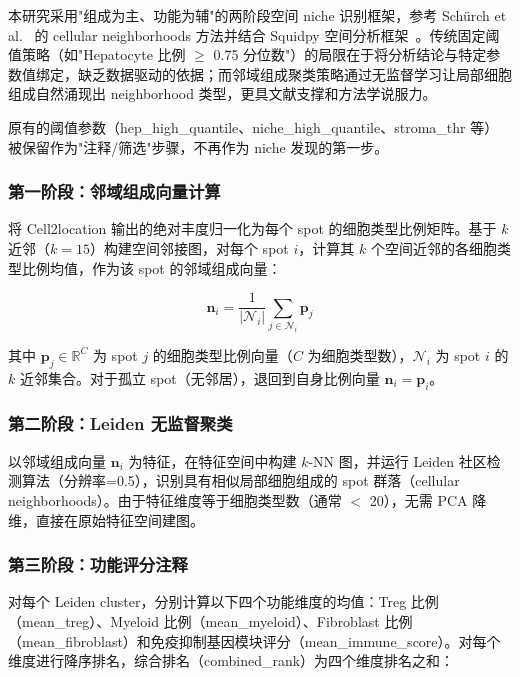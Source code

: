 \documentclass[12pt, a4paper]{ctexart}
\begin{document}
本研究采用"组成为主、功能为辅"的两阶段空间 niche 识别框架，参考 Schürch et al.~\cite{schurch2020coordinated} 的 cellular neighborhoods 方法并结合 Squidpy 空间分析框架~\cite{palla2022squidpy}。传统固定阈值策略（如"Hepatocyte 比例 $\geq$ 0.75 分位数"）的局限在于将分析结论与特定参数值绑定，缺乏数据驱动的依据；而邻域组成聚类策略通过无监督学习让局部细胞组成自然涌现出 neighborhood 类型，更具文献支撑和方法学说服力。

原有的阈值参数（hep\_high\_quantile、niche\_high\_quantile、stroma\_thr 等）被保留作为"注释/筛选"步骤，不再作为 niche 发现的第一步。

\subsubsection{第一阶段：邻域组成向量计算}

将 Cell2location 输出的绝对丰度归一化为每个 spot 的细胞类型比例矩阵。基于 $k$ 近邻（$k=15$）构建空间邻接图，对每个 spot $i$，计算其 $k$ 个空间近邻的各细胞类型比例均值，作为该 spot 的邻域组成向量：

\begin{equation}
\mathbf{n}_i = \frac{1}{|\mathcal{N}_i|} \sum_{j \in \mathcal{N}_i} \mathbf{p}_j
\end{equation}

其中 $\mathbf{p}_j \in \mathbb{R}^{C}$ 为 spot $j$ 的细胞类型比例向量（$C$ 为细胞类型数），$\mathcal{N}_i$ 为 spot $i$ 的 $k$ 近邻集合。对于孤立 spot（无邻居），退回到自身比例向量 $\mathbf{n}_i = \mathbf{p}_i$。

\subsubsection{第二阶段：Leiden 无监督聚类}

以邻域组成向量 $\mathbf{n}_i$ 为特征，在特征空间中构建 $k$-NN 图，并运行 Leiden 社区检测算法（分辨率=0.5），识别具有相似局部细胞组成的 spot 群落（cellular neighborhoods）。由于特征维度等于细胞类型数（通常 $<$ 20），无需 PCA 降维，直接在原始特征空间建图。

\subsubsection{第三阶段：功能评分注释}

对每个 Leiden cluster，分别计算以下四个功能维度的均值：Treg 比例（mean\_treg）、Myeloid 比例（mean\_myeloid）、Fibroblast 比例（mean\_fibroblast）和免疫抑制基因模块评分（mean\_immune\_score）。对每个维度进行降序排名，综合排名（combined\_rank）为四个维度排名之和：
\end{document}
